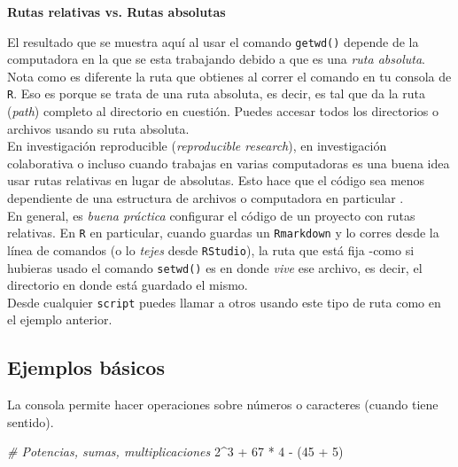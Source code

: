 \documentclass[]{article}
\newenvironment{Shaded}{\begin{snugshade}}{\end{snugshade}}
\newcommand{\DecValTok}[1]{\textcolor[rgb]{0.00,0.00,0.81}{{#1}}}
\newcommand{\StringTok}[1]{\textcolor[rgb]{0.31,0.60,0.02}{{#1}}}
\newcommand{\CommentTok}[1]{\textcolor[rgb]{0.56,0.35,0.01}{\textit{{#1}}}}
\newcommand{\NormalTok}[1]{{#1}}
\begin{document}
\begin{nota}
\textbf{Rutas relativas vs. Rutas absolutas\\}

El resultado que se muestra aquí al usar el comando \texttt{getwd()} depende de la computadora en la que se esta 
trabajando debido a que es una \textit{ruta absoluta}. Nota como es diferente la ruta 
que obtienes al correr el comando en tu consola de \texttt{R}. Eso es porque se trata 
de una ruta absoluta, es decir, es tal que da la ruta (\textit{path}) completo
al directorio en cuestión. Puedes accesar todos los directorios o archivos usando su ruta absoluta.\\

En investigación reproducible (\textit{reproducible research}), en investigación colaborativa o
incluso cuando trabajas en varias computadoras es una buena idea usar rutas relativas
en lugar de absolutas. Esto hace que el código sea menos dependiente de una estructura
de archivos o computadora en particular \parencite[][p. 67]{gandrud2013}. \\

En general, es \textit{buena práctica} configurar el código de un proyecto con rutas relativas.
En \texttt{R} en particular, cuando guardas un \texttt{Rmarkdown} y lo corres desde la línea de
comandos (o lo \textit{tejes} desde \texttt{RStudio}), la ruta que está fija -como si hubieras usado el comando \texttt{setwd()} es
en donde \textit{vive} ese archivo, es decir, el directorio en donde está guardado el mismo.\\

Desde cualquier \texttt{script} puedes llamar a otros usando este tipo de ruta como en 
el ejemplo anterior.
\end{nota}

\subsection{Ejemplos básicos}\label{ejemplos-basicos}

La consola permite hacer operaciones sobre números o caracteres (cuando
tiene sentido).

\begin{Shaded}
\begin{Highlighting}[]
\CommentTok{# Potencias, sumas, multiplicaciones}
\DecValTok{2}\NormalTok{^}\DecValTok{3} \NormalTok{+}\StringTok{ }\DecValTok{67} \NormalTok{*}\StringTok{ }\DecValTok{4} \NormalTok{-}\StringTok{ }\NormalTok{(}\DecValTok{45} \NormalTok{+}\StringTok{ }\DecValTok{5}\NormalTok{)}
\end{Highlighting}
\end{Shaded}
\end{document}
